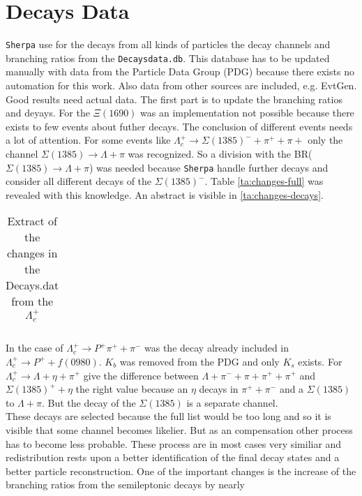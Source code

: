 \section{Decays Data}
\texttt{Sherpa} use for the decays from all kinds of particles the decay channels 
and branching ratios from the \texttt{Decaysdata.db}. This database has to be 
updated manually with data from the Particle Data Group (PDG) because there 
exists no automation for this work. Also data from other sources are included, 
e.g. EvtGen.\\
Good results need actual data. The first part is to update the branching ratios 
and deyays. For the \(\Xi(1690)\) was an implementation not possible because 
there exists to few events about futher decays. The conclusion of different events 
needs a lot of attention. For some events like \(\Lambda_c^+ \rightarrow  
\Sigma(1385)^- + \pi^+ + \pi+\) only the channel \(\Sigma(1385) \rightarrow 
\Lambda + \pi\) was recognized. So a division with the BR(\(\Sigma(1385) 
\rightarrow \Lambda + \pi\)) was needed because \texttt{Sherpa} handle further 
decays and consider all different decays of the \(\Sigma(1385)^-\). Table 
{\eqref{ta:changes-full}} was revealed with this knowledge. An abstract is 
visible in {\eqref{ta:changes-decays}}.
\begin{longtable}{| c | c | c |}
  \caption{Extract of the changes in the Decays.dat from the \(\Lambda_c^+\)}\label{ta:changes-decays}\\ 
  \hline
  
\end{longtable}
In the case of \(\Lambda_c^+ \rightarrow P^+ \pi^+ + \pi^-\) was the decay 
already included in \(\Lambda_c^+ \rightarrow P^+ + f(0980)\). \(K_b\) was 
removed from the PDG and only \(K_s\) exists. For \(\Lambda_c^+ \rightarrow 
\Lambda + \eta + \pi^+\) give the difference between \(\Lambda + \pi^- + 
\pi + \pi^+ + \pi^+\) and  \(\Sigma(1385)^+ + \eta\) the right value because 
an \(\eta\) decays in \(\pi^+ + \pi^-\) and a \(\Sigma(1385)\) to 
\(\Lambda + \pi\). But the decay of the \(\Sigma(1385)\) is a separate channel.\\
These decays are selected because the full list would be too long and so 
it is visible that some channel becomes likelier. But as an compensation other 
process has to become less probable. These process are in most cases very 
similiar and redistribution rests upon a better identification of the final 
decay states and a better particle reconstruction. One of the important changes 
is the increase of the branching ratios from the semileptonic decays by nearly 
